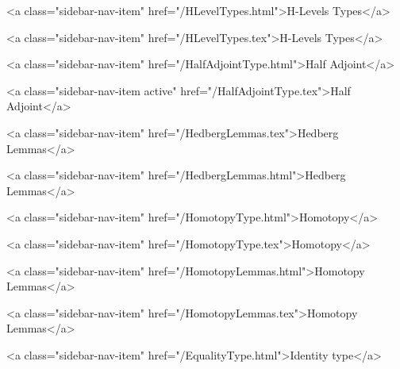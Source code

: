       
        
          <a class="sidebar-nav-item" href="/HLevelTypes.html">H-Levels Types</a>
        
      
    
      
        
          <a class="sidebar-nav-item" href="/HLevelTypes.tex">H-Levels Types</a>
        
      
    
      
        
          <a class="sidebar-nav-item" href="/HalfAdjointType.html">Half Adjoint</a>
        
      
    
      
        
          <a class="sidebar-nav-item active" href="/HalfAdjointType.tex">Half Adjoint</a>
        
      
    
      
        
          <a class="sidebar-nav-item" href="/HedbergLemmas.tex">Hedberg Lemmas</a>
        
      
    
      
        
          <a class="sidebar-nav-item" href="/HedbergLemmas.html">Hedberg Lemmas</a>
        
      
    
      
        
          <a class="sidebar-nav-item" href="/HomotopyType.html">Homotopy</a>
        
      
    
      
        
          <a class="sidebar-nav-item" href="/HomotopyType.tex">Homotopy</a>
        
      
    
      
        
          <a class="sidebar-nav-item" href="/HomotopyLemmas.html">Homotopy Lemmas</a>
        
      
    
      
        
          <a class="sidebar-nav-item" href="/HomotopyLemmas.tex">Homotopy Lemmas</a>
        
      
    
      
        
          <a class="sidebar-nav-item" href="/EqualityType.html">Identity type</a>
        
      
    
